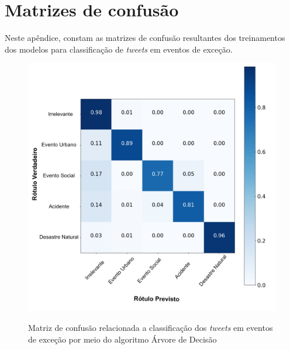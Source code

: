\documentclass[
	12pt,				%
	oneside,			%
	a4paper,			%
	english,			%
	brazil				%
	]{abntex2ppgsi}
\begin{document}
{{{\begin{apendicesenv}
\begin{longtable}{c|c|p{7cm}}
\end{longtable}

\normalsize

\chapter{Matrizes de confusão}
\label{apendiceE}

Neste apêndice, constam as matrizes de confusão resultantes dos treinamentos dos modelos para classificação de \textit{tweets} em eventos de exceção.

\begin{figure}[!htb]
	\centering
 	  \caption{Matriz de confusão relacionada a classificação dos \textit{tweets} em eventos de exceção por meio do algoritmo Árvore de Decisão}
		\includegraphics[width=1\linewidth]{images/confusion_matrix_dt_pt.png}
	\label{fig:confusion_matrix_dt}
\end{figure}


\end{apendicesenv}}}}
\end{document}
